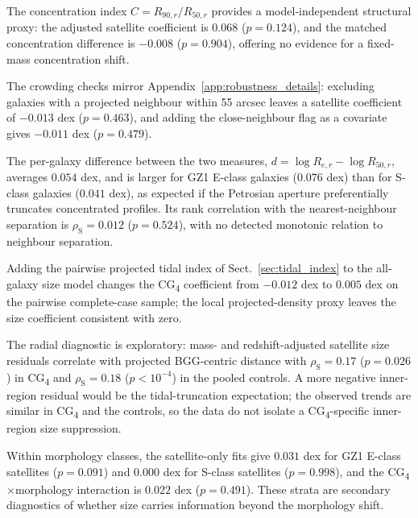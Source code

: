 \documentclass{aa}
\newcommand{\CG}{CG\textsubscript{4}}
\begin{document}
\begin{appendix}
The concentration index \(C = R_{90,r}/R_{50,r}\) provides a model-independent structural proxy: the adjusted satellite coefficient is \(0.068\) (\(p = 0.124\)), and the matched concentration difference is \(-0.008\) (\(p = 0.904\)), offering no evidence for a fixed-mass concentration shift.


The crowding checks mirror Appendix~\ref{app:robustness_details}: excluding galaxies with a projected neighbour within 55 arcsec leaves a satellite coefficient of \(-0.013\) dex (\(p = 0.463\)), and adding the close-neighbour flag as a covariate gives \(-0.011\) dex (\(p = 0.479\)).



The per-galaxy difference between the two measures, \(d = \log R_{e,r} - \log R_{50,r}\), averages \(0.054\) dex, and is larger for GZ1 E-class galaxies (\(0.076\) dex) than for S-class galaxies (\(0.041\) dex), as expected if the Petrosian aperture preferentially truncates concentrated profiles. Its rank correlation with the nearest-neighbour separation is \(\rho_\mathrm{S} = 0.012\) (\(p = 0.524\)), with no detected monotonic relation to neighbour separation.



Adding the pairwise projected tidal index of Sect.~\ref{sec:tidal_index} to the all-galaxy size model changes the \CG{} coefficient from \(-0.012\) dex to \(0.005\) dex on the pairwise complete-case sample; the local projected-density proxy leaves the size coefficient consistent with zero.



The radial diagnostic is exploratory: mass- and redshift-adjusted satellite size residuals correlate with projected BGG-centric distance with \(\rho_\mathrm{S} = 0.17\) (\(p = 0.026\)) in \CG{} and \(\rho_\mathrm{S} = 0.18\) (\(p<10^{-4}\)) in the pooled controls. A more negative inner-region residual would be the tidal-truncation expectation; the observed trends are similar in \CG{} and the controls, so the data do not isolate a \CG{}-specific inner-region size suppression.





Within morphology classes, the satellite-only fits give \(0.031\) dex for GZ1 E-class satellites (\(p = 0.091\)) and \(0.000\) dex for S-class satellites (\(p = 0.998\)), and the \CG{}\(\times\)morphology interaction is \(0.022\) dex (\(p = 0.491\)). These strata are secondary diagnostics of whether size carries information beyond the morphology shift.






\end{appendix}
\end{document}

